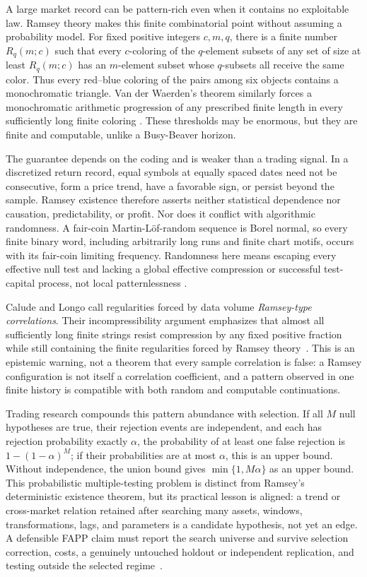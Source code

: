 \documentclass[aps,pra,reprint,superscriptaddress,amsmath,amssymb,floatfix]{revtex4-2}
\theoremstyle{plain}
\theoremstyle{definition}
\theoremstyle{remark}
\begin{document}
A large market record can be pattern-rich even when it contains no exploitable
law. Ramsey theory makes this finite combinatorial point without assuming a
probability model. For fixed positive integers \(c,m,q\), there is a finite
number \(R_q(m;c)\) such that every \(c\)-coloring of the \(q\)-element subsets
of any set of size at least \(R_q(m;c)\) has an \(m\)-element subset whose
\(q\)-subsets all receive the same color. Thus every red--blue coloring of the
pairs among six objects contains a monochromatic triangle. Van der Waerden's
theorem similarly forces a monochromatic arithmetic progression of any
prescribed finite length in every sufficiently long finite coloring
\cite{Ramsey-GRS-90,GS-90}. These thresholds may be enormous, but they are
finite and computable, unlike a Busy-Beaver horizon.

The guarantee depends on the coding and is weaker than a trading signal. In a
discretized return record, equal symbols at equally spaced dates need not be
consecutive, form a price trend, have a favorable sign, or persist beyond the
sample. Ramsey existence therefore asserts neither statistical dependence nor
causation, predictability, or profit. Nor does it conflict with algorithmic
randomness. A fair-coin Martin-L\"of-random sequence is Borel normal, so every
finite binary word, including arbitrarily long runs and finite chart motifs,
occurs with its fair-coin limiting frequency. Randomness here means escaping
every effective null test and lacking a global effective compression or
successful test-capital process, not local patternlessness
\cite{calude:02,Nies2009}.

Calude and Longo call regularities forced by data volume \emph{Ramsey-type
correlations}. Their incompressibility argument emphasizes that almost all
sufficiently long finite strings resist compression by any fixed positive
fraction while still containing the finite regularities forced by Ramsey
theory~\cite{Calude2016}. This is an epistemic warning, not a theorem that every
sample correlation is false: a Ramsey configuration is not itself a
correlation coefficient, and a pattern observed in one finite history is
compatible with both random and computable continuations.

Trading research compounds this pattern abundance with selection. If all
\(M\) null hypotheses are true, their rejection events are independent, and
each has rejection probability exactly \(\alpha\), the probability of at least
one false rejection is
\(1-(1-\alpha)^M\); if their probabilities are at most \(\alpha\), this is an
upper bound. Without independence, the union bound gives
\(\min\{1,M\alpha\}\) as an upper bound. This
probabilistic multiple-testing problem is distinct from Ramsey's deterministic
existence theorem, but its practical lesson is aligned: a trend or cross-market
relation retained after searching many assets, windows, transformations, lags,
and parameters is a candidate hypothesis, not yet an edge. A defensible FAPP
claim must report the search universe and survive selection correction, costs,
a genuinely untouched holdout or independent replication, and testing outside
the selected regime~\cite{BaileyLopez2014}.
\end{document}

